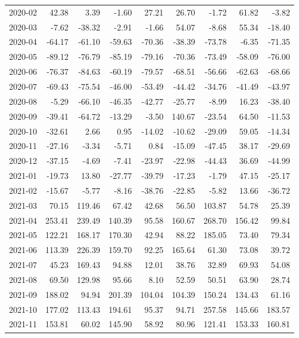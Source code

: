 \begin{table}[ht]
\begin{tabular}{lrrrrrrrr}
  2020-02 & 42.38 & 3.39 & -1.60 & 27.21 & 26.70 & -1.72 & 61.82 & -3.82 \\ 
  2020-03 & -7.62 & -38.32 & -2.91 & -1.66 & 54.07 & -8.68 & 55.34 & -18.40 \\ 
  2020-04 & -64.17 & -61.10 & -59.63 & -70.36 & -38.39 & -73.78 & -6.35 & -71.35 \\ 
  2020-05 & -89.12 & -76.79 & -85.19 & -79.16 & -70.36 & -73.49 & -58.09 & -76.00 \\ 
  2020-06 & -76.37 & -84.63 & -60.19 & -79.57 & -68.51 & -56.66 & -62.63 & -68.66 \\ 
  2020-07 & -69.43 & -75.54 & -46.00 & -53.49 & -44.42 & -34.76 & -41.49 & -43.97 \\ 
  2020-08 & -5.29 & -66.10 & -46.35 & -42.77 & -25.77 & -8.99 & 16.23 & -38.40 \\ 
  2020-09 & -39.41 & -64.72 & -13.29 & -3.50 & 140.67 & -23.54 & 64.50 & -11.53 \\ 
  2020-10 & -32.61 & 2.66 & 0.95 & -14.02 & -10.62 & -29.09 & 59.05 & -14.34 \\ 
  2020-11 & -27.16 & -3.34 & -5.71 & 0.84 & -15.09 & -47.45 & 38.17 & -29.69 \\ 
  2020-12 & -37.15 & -4.69 & -7.41 & -23.97 & -22.98 & -44.43 & 36.69 & -44.99 \\ 
  2021-01 & -19.73 & 13.80 & -27.77 & -39.79 & -17.23 & -1.79 & 47.15 & -25.17 \\ 
  2021-02 & -15.67 & -5.77 & -8.16 & -38.76 & -22.85 & -5.82 & 13.66 & -36.72 \\ 
  2021-03 & 70.15 & 119.46 & 67.42 & 42.68 & 56.50 & 103.87 & 54.78 & 25.39 \\ 
  2021-04 & 253.41 & 239.49 & 140.39 & 95.58 & 160.67 & 268.70 & 156.42 & 99.84 \\ 
  2021-05 & 122.21 & 168.17 & 170.30 & 42.94 & 88.22 & 185.05 & 73.40 & 79.34 \\ 
  2021-06 & 113.39 & 226.39 & 159.70 & 92.25 & 165.64 & 61.30 & 73.08 & 39.72 \\ 
  2021-07 & 45.23 & 169.43 & 94.88 & 12.01 & 38.76 & 32.89 & 69.93 & 54.08 \\ 
  2021-08 & 69.50 & 129.98 & 95.66 & 8.10 & 52.59 & 50.51 & 63.90 & 28.74 \\ 
  2021-09 & 188.02 & 94.94 & 201.39 & 104.04 & 104.39 & 150.24 & 134.43 & 61.16 \\ 
  2021-10 & 177.02 & 113.43 & 194.61 & 95.37 & 94.71 & 257.58 & 145.66 & 183.57 \\ 
  2021-11 & 153.81 & 60.02 & 145.90 & 58.92 & 80.96 & 121.41 & 153.33 & 160.81 \\ 

\end{tabular}
\end{table}
